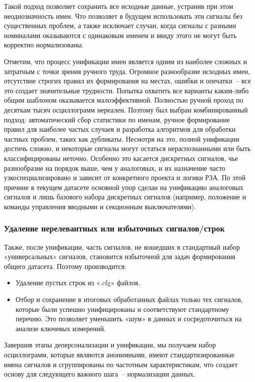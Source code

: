 Такой подход позволяет сохранить все исходные данные, устранив при этом неоднозначность
имен. Что позволяет в будущем использовать эти сигналы без существенных проблем, а также
исключает случаи, когда сигналы с разными номиналами оказываются с одинаковым именем и
ввиду этого не могут быть корректно нормализованы.

Отметим, что процесс унификации имен является одним из наиболее сложных и затратным с
точки зрения ручного труда. Огромное разнообразие исходных имен, отсутствие строгих
правил их формирования на местах, ошибки и опечатки~-- все это создает значительные
трудности. Попытка охватить все варианты каким-либо общим шаблоном оказывается
малоэффективной. Полностью ручной проход по десяткам тысяч осциллограмм нереален.
Поэтому был выбран комбинированный подход: автоматический сбор статистики по именам,
ручное формирование правил для наиболее частых случаев и разработка алгоритмов для
обработки частных проблем, таких как дубликаты. Несмотря на это, полной унификации
достичь сложно, и некоторые сигналы могут остаться нераспознанными или быть
классифицированы неточно. Особенно это касается дискретных сигналов, чье разнообразие на
порядок выше, чем у аналоговых, и их назначение часто узкоспециализировано и зависит от
конкретного проекта и логики РЗА. По этой причине в текущем датасете основной упор
сделан на унификацию аналоговых сигналов и лишь базового набора дискретных сигналов
(например, положение и команды управления вводными и секционным выключателями).

\subsubsection{Удаление нерелевантных или избыточных сигналов/строк}\label{sec:ch3_removing_irrelevant_signals}

Также, после унификации, часть сигналов, не вошедших в стандартный набор «универсальных»
сигналов, становится избыточной для задач формирования общего датасета. Поэтому
производится:

\begin{itemize}
  \item Удаление пустых строк из «.cfg» файлов.
  \item Отбор и сохранение в итоговых обработанных файлах только тех сигналов, которые были успешно унифицированы и соответствуют стандартному перечню. Это позволяет уменьшить «шум» в данных и сосредоточиться на анализе ключевых измерений.
\end{itemize}

Завершив этапы деперсонализации и унификации, мы получаем набор осциллограмм, которые
являются анонимными, имеют стандартизированные имена сигналов и сгруппированы по
частотным характеристикам, что создает основу для следующего важного шага~--
нормализации данных.



